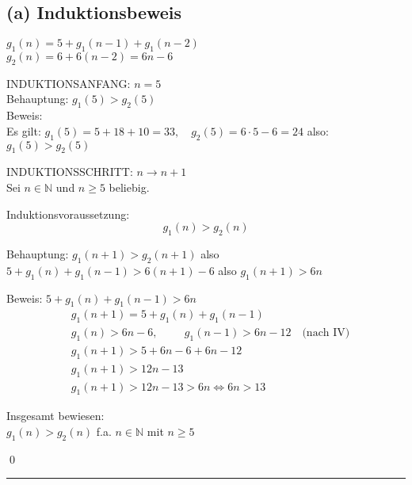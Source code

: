 \documentclass[a4paper, 11pt]{article}
\begin{document}
\subsection*{(a) Induktionsbeweis}

\begin{center}
    \begin{minipage}{0.4\textwidth}
    $g_1(n) = 5 + g_1(n - 1) + g_1(n - 2)$ \\
    $g_2(n) = 6 + 6 (n - 2) = 6n - 6$
    \end{minipage}
    \end{center}

\noindent INDUKTIONSANFANG: $n = 5$ \\
    Behauptung: $g_1(5) > g_2(5)$ \\
    Beweis: \\
    Es gilt: \hfill $g_1(5) = 5 + 18 + 10 = 33, \quad g_2(5) = 6 \cdot 5 - 6 = 24$ \hfill also: \quad $g_1(5) > g_2(5)$

\vspace{0.5cm}
    
\noindent INDUKTIONSSCHRITT: $n \rightarrow n + 1$ \\
Sei $n \in \mathbb{N}$ und $n \geq 5$ beliebig.

\noindent Induktionsvoraussetzung: 
    $$g_1(n) > g_2(n)$$

\noindent Behauptung: $g_1(n + 1) > g_2(n + 1)$ \quad also \quad $5 + g_1(n) + g_1(n - 1) > 6(n + 1) - 6$ \quad also \quad $g_1(n + 1) > 6n$

\noindent Beweis: $5 + g_1(n) + g_1(n - 1) > 6n$
\begin{align}
    &g_1(n + 1) = 5 + g_1(n) + g_1(n - 1) \\
    &g_1(n) > 6n - 6, \hspace{1cm} g_1(n - 1) > 6n - 12 \quad \text{(nach IV)} \\
    &g_1(n + 1) > 5 + 6n - 6 + 6n - 12 \\
    &g_1(n + 1) > 12n - 13 \\
    &g_1(n + 1) > 12n - 13 > 6n \iff 6n > 13
\end{align}

\noindent Insgesamt bewiesen: \\
$g_1(n) > g_2(n)$ f.a. $n \in \mathbb{N}$ mit $n \geq 5$

\hfill \qed
\vspace{0.5cm}
\hrule
\end{document}
